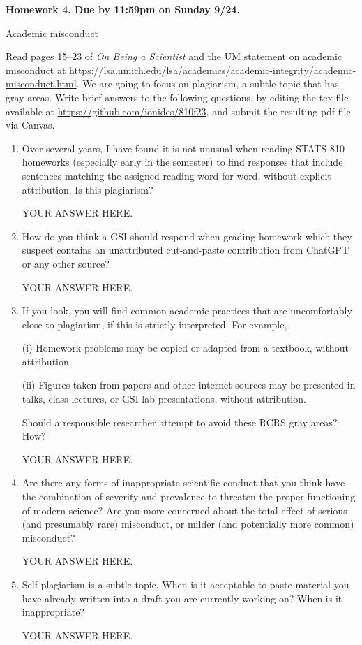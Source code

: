 \documentclass[12pt]{article}
\begin{document}
\begin{center}\bf
Homework 4. Due by 11:59pm on Sunday 9/24.

Academic misconduct

\end{center}
Read pages 15--23 of {\em On Being a Scientist} and the UM statement on academic misconduct at \url{https://lsa.umich.edu/lsa/academics/academic-integrity/academic-misconduct.html}. We are going to focus on plagiarism, a subtle topic that has gray areas. Write brief answers to the following questions, by editing the tex file available at \url{https://github.com/ionides/810f23}, and submit the resulting pdf file via Canvas. 

\begin{enumerate}

\item Over several years, I have found it is not unusual when reading STATS 810 homeworks (especially early in the semester) to find responses that include sentences matching the assigned reading word for word, without explicit attribution. Is this plagiarism?

YOUR ANSWER HERE.

\item How do you think a GSI should respond when grading homework which they suspect contains an unattributed cut-and-paste contribution from ChatGPT or any other source?

YOUR ANSWER HERE.

\item If you look, you will find common academic practices that are uncomfortably close to plagiarism, if this is strictly interpreted. For example,

(i) Homework problems may be copied or adapted from a textbook, without attribution.

(ii) Figures taken from papers and other internet sources may be presented in talks, class lectures, or GSI lab presentations, without attribution.

Should a responsible researcher attempt to avoid these RCRS gray areas? How?
  

YOUR ANSWER HERE.

\item Are there any forms of inappropriate scientific conduct that you think have the combination of severity and prevalence to threaten the proper functioning of modern science? Are you more concerned about the total effect of serious (and presumably rare) misconduct, or milder (and potentially more common) misconduct?

YOUR ANSWER HERE.

\item Self-plagiarism is a subtle topic. When is it acceptable to paste material you have already written into a draft you are currently working on? When is it inappropriate?

YOUR ANSWER HERE.

\end{enumerate}
\end{document}
